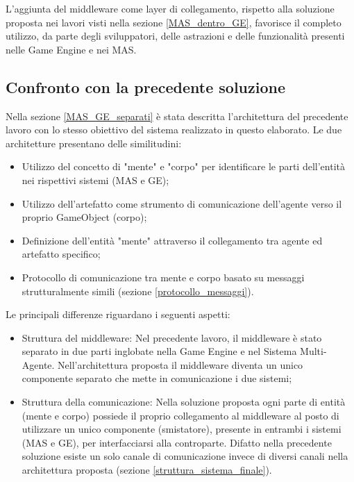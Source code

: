 L'aggiunta del middleware come layer di collegamento, rispetto alla soluzione proposta nei lavori visti nella sezione \ref{MAS_dentro_GE}, favorisce il completo utilizzo, da parte degli sviluppatori, delle astrazioni e delle funzionalità presenti nelle Game Engine e nei MAS.

\medskip

\subsection{Confronto con la precedente soluzione}

Nella sezione \ref{MAS_GE_separati} è stata descritta l'architettura del precedente lavoro \cite{amslaurea12270} con lo stesso obiettivo del sistema realizzato in questo elaborato. Le due architetture presentano delle similitudini:
\begin{itemize}
    \item Utilizzo del concetto di "mente" e "corpo" per identificare le parti dell'entità nei rispettivi sistemi (MAS e GE);
    \item Utilizzo dell'artefatto come strumento di comunicazione dell'agente verso il proprio GameObject (corpo);
    \item Definizione dell'entità "mente" attraverso il collegamento tra agente ed artefatto specifico;
    \item Protocollo di comunicazione tra mente e corpo basato su messaggi strutturalmente simili (sezione \ref{protocollo_messaggi}).
\end{itemize}

Le principali differenze riguardano i seguenti aspetti:
\begin{itemize}
    \item Struttura del middleware: Nel precedente lavoro, il middleware è stato separato in due parti inglobate nella Game Engine e nel Sistema Multi-Agente. Nell'architettura proposta il middleware diventa un unico componente separato che mette in comunicazione i due sistemi;
    \item Struttura della comunicazione: Nella soluzione proposta ogni parte di entità (mente e corpo) possiede il proprio collegamento al middleware al posto di utilizzare un unico componente (smistatore), presente in entrambi i sistemi (MAS e GE), per interfacciarsi alla controparte. Difatto nella precedente soluzione esiste un solo canale di comunicazione invece di diversi canali nella architettura proposta (sezione \ref{struttura_sistema_finale}).
\end{itemize}